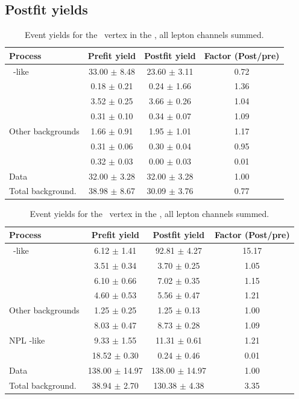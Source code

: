 \subsection{Postfit yields}
\label{app:postfityields}
  \begin{table}[htbp]
	\centering
		\caption{Event yields for the \Zct\ vertex in the \STCR,   all lepton channels summed. }
	\begin{tabular} {l c c c }
		\toprule
		Process & Prefit yield & Postfit yield & Factor (Post/pre) \\
		\midrule
		\NPL\ \ttbar-like & 33.00 $ \pm $ 8.48 & 23.60 $ \pm $ 3.11 & 0.72 \\ 
		\ttZ & 0.18 $ \pm $ 0.21 & 0.24 $ \pm $ 1.66 & 1.36 \\ 
		\WZ & 3.52 $ \pm $ 0.25 & 3.66 $ \pm $ 0.26 & 1.04 \\ 
		\ZZ & 0.31 $ \pm $ 0.10 & 0.34 $ \pm $ 0.07 & 1.09 \\ 
		Other backgrounds & 1.66 $ \pm $ 0.91 & 1.95 $ \pm $ 1.01 & 1.17 \\ 
		\tZq & 0.31 $ \pm $ 0.06 & 0.30 $ \pm $ 0.04 & 0.95 \\ 
		\kZct  & 0.32 $ \pm $ 0.03 & 0.00 $ \pm $ 0.03 & 0.01 \B \\
		\hdashline
		Data & 32.00 $ \pm $ 3.28 & 32.00 $ \pm $ 3.28 & 1.00 \T \\
		Total background. & 38.98 $ \pm $ 8.67 & 30.09 $ \pm $ 3.76 & 0.77\\
		\bottomrule
	\end{tabular}
\end{table}

\begin{table}[htbp]
	\centering
		\caption{Event yields for the \Zct\ vertex in the \STSR,   all lepton channels summed. }
	
	\begin{tabular} {l c c c }
		\toprule
		Process & Prefit yield & Postfit yield & Factor (Post/pre) \\
		\midrule
		\NPL\ \DY-like & 6.12 $ \pm $ 1.41 & 92.81 $ \pm $ 4.27 & 15.17 \\ 
		\ttZ & 3.51 $ \pm $ 0.34 & 3.70 $ \pm $ 0.25 & 1.05 \\ 
		\WZ & 6.10 $ \pm $ 0.66 & 7.02 $ \pm $ 0.35 & 1.15 \\ 
		\ZZ & 4.60 $ \pm $ 0.53 & 5.56 $ \pm $ 0.47 & 1.21 \\ 
		Other backgrounds & 1.25 $ \pm $ 0.25 & 1.25 $ \pm $ 0.13 & 1.00 \\ 
		\tZq & 8.03 $ \pm $ 0.47 & 8.73 $ \pm $ 0.28 & 1.09 \\ 
		NPL \ttbar-like & 9.33 $ \pm $ 1.55 & 11.31 $ \pm $ 0.61 & 1.21\\
		\kZct  & 18.52 $ \pm $ 0.30 & 0.24 $ \pm $ 0.46 & 0.01 \B \\
		\hdashline
		Data & 138.00 $ \pm $ 14.97 & 138.00 $ \pm $ 14.97 & 1.00 \T\\
		Total background. & 38.94 $ \pm $ 2.70 & 130.38 $ \pm $ 4.38 & 3.35\\
		\bottomrule
	\end{tabular}
\end{table}

